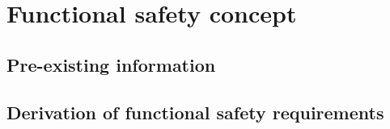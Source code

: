 \section{Functional safety concept}
%
% 

\subsection{Pre-existing information}
%

\subsection{Derivation of functional safety requirements}
%
%
%
%
%
%


